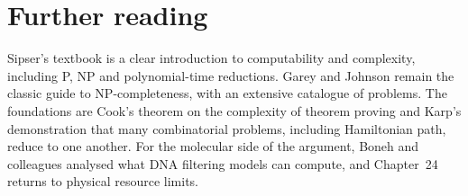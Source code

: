 \section*{Further reading}
Sipser's textbook is a clear introduction to computability and complexity,
including P, NP and polynomial-time reductions.\cite{Sipser2013} Garey and
Johnson remain the classic guide to NP-completeness, with an extensive catalogue
of problems.\cite{GareyJohnson1979} The foundations are Cook's theorem on the
complexity of theorem proving\cite{Cook1971} and Karp's demonstration that many
combinatorial problems, including Hamiltonian path, reduce to one
another.\cite{Karp1972} For the molecular side of the argument, Boneh and
colleagues analysed what DNA filtering models can compute,\cite{Boneh1996} and
Chapter~24 returns to physical resource limits.
